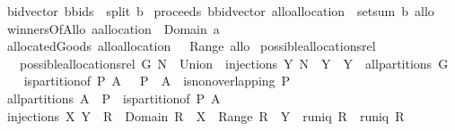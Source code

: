 \begin{isabellebody}
\isamarkupfalse%
\ {\isachardoublequoteopen}bidvector\ {\isacharparenleft}b{\isacharcolon}{\isacharcolon}bids{\isacharparenright}\ {\isacharequal}{\isacharequal}\ split\ b{\isachardoublequoteclose}\isanewline
{}\isamarkupfalse%
\ {\isachardoublequoteopen}proceeds\ {\isacharparenleft}b{\isacharcolon}{\isacharcolon}bidvector{\isacharparenright}\ {\isacharparenleft}allo{\isacharcolon}{\isacharcolon}allocation{\isacharparenright}\ {\isacharequal}{\isacharequal}\ setsum\ b\ allo{\isachardoublequoteclose}\isanewline
{}\isamarkupfalse%
\ {\isachardoublequoteopen}winnersOfAllo\ {\isacharparenleft}a{\isacharcolon}{\isacharcolon}allocation{\isacharparenright}\ {\isacharequal}{\isacharequal}\ Domain\ a{\isachardoublequoteclose}\isanewline
{}\isamarkupfalse%
\ {\isachardoublequoteopen}allocatedGoods\ {\isacharparenleft}allo{\isacharcolon}{\isacharcolon}allocation{\isacharparenright}\ {\isacharequal}{\isacharequal}\ {\isasymUnion}\ {\isacharparenleft}Range\ allo{\isacharparenright}{\isachardoublequoteclose}\isanewline
\isanewline
\isanewline
{}\isamarkupfalse%
\ possible{\isacharunderscore}allocations{\isacharunderscore}rel\ \isanewline
\ \ \ {\isachardoublequoteopen}possible{\isacharunderscore}allocations{\isacharunderscore}rel\ G\ N\ {\isacharequal}\ Union\ {\isacharbraceleft}\ injections\ Y\ N\ {\isacharbar}\ Y\ {\isachardot}\ Y\ {\isasymin}\ all{\isacharunderscore}partitions\ G\ {\isacharbraceright}{\isachardoublequoteclose}\ \isanewline
\isanewline
\isanewline
\isanewline
{}\isamarkupfalse%
\ {\isachardoublequoteopen}is{\isacharunderscore}partition{\isacharunderscore}of{\isacharprime}\ P\ A\ {\isacharequal}{\isacharequal}\ {\isacharparenleft}{\isasymUnion}\ P\ {\isacharequal}\ A\ {\isasymand}\ is{\isacharunderscore}non{\isacharunderscore}overlapping\ P{\isacharparenright}{\isachardoublequoteclose}\isanewline
{}\isamarkupfalse%
\ {\isachardoublequoteopen}all{\isacharunderscore}partitions{\isacharprime}\ A\ {\isacharequal}{\isacharequal}\ {\isacharbraceleft}P\ {\isachardot}\ is{\isacharunderscore}partition{\isacharunderscore}of{\isacharprime}\ P\ A{\isacharbraceright}{\isachardoublequoteclose}\isanewline
{}\isamarkupfalse%
\ {\isachardoublequoteopen}injections{\isacharprime}\ X\ Y\ {\isacharequal}{\isacharequal}\ {\isacharbraceleft}R\ {\isachardot}\ Domain\ R\ {\isacharequal}\ X\ {\isasymand}\ Range\ R\ {\isasymsubseteq}\ Y\ {\isasymand}\ runiq\ R\ {\isasymand}\ runiq\ {\isacharparenleft}R{\isasyminverse}{\isacharparenright}{\isacharbraceright}{\isachardoublequoteclose}\isanewline

\end{isabellebody}
